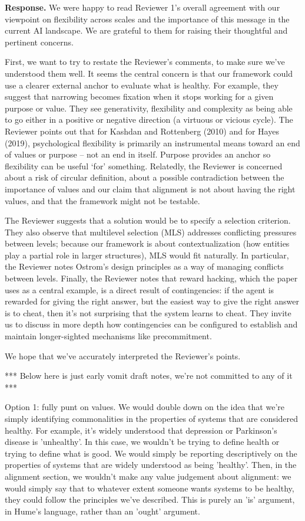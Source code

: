 \documentclass[fontsize=11.5pt]{scrartcl}
\newcounter{point}
\begin{document}
\noindent\textbf{Response.} We were happy to read Reviewer 1's overall agreement with our viewpoint on flexibility across scales and the importance of this message in the current AI landscape. We are grateful to them for raising their thoughtful and pertinent concerns.

First, we want to try to restate the Reviewer's comments, to make sure we've understood them well. It seems the central concern is that our framework could use a clearer external anchor to evaluate what is healthy. For example, they suggest that narrowing becomes fixation when it stops working for a given purpose or value. They see generativity, flexibility and complexity as being able to go either in a positive or negative direction (a virtuous or vicious cycle). The Reviewer points out that for Kashdan and Rottenberg (2010) and for Hayes (2019), psychological flexibility is primarily an instrumental means toward an end of values or purpose -- not an end in itself. Purpose provides an anchor so flexibility can be useful `for' something. Relatedly, the Reviewer is concerned about a risk of circular definition, about a possible contradiction between the importance of values and our claim that alignment is not about having the right values, and that the framework might not be testable. 

The Reviewer suggests that a solution would be to specify a selection criterion. They also observe that multilevel selection (MLS) addresses conflicting pressures between levels; because our framework is about contextualization (how entities play a partial role in larger structures), MLS would fit naturally. In particular, the Reviewer notes Ostrom's design principles as a way of managing conflicts between levels. Finally, the Reviewer notes that reward hacking, which the paper uses as a central example, is a direct result of contingencies: if the agent is rewarded for giving the right answer, but the easiest way to give the right answer is to cheat, then it's not surprising that the system learns to cheat. They invite us to discuss in more depth how contingencies can be configured to establish and maintain longer-sighted mechanisms like precommitment. 

We hope that we've accurately interpreted the Reviewer's points. 


*** Below here is just early vomit draft notes, we're not committed to any of it ***

Option 1: fully punt on values. We would double down on the idea that we're simply identifying commonalities in the properties of systems that are considered healthy. For example, it's widely understood that depression or Parkinson's disease is 'unhealthy'. In this case, we wouldn't be trying to define health or trying to define what is good. We would simply be reporting descriptively on the properties of systems that are widely understood as being 'healthy'. Then, in the alignment section, we wouldn't make any value judgement about alignment: we would simply say that to whatever extent someone wants systems to be healthy, they could follow the principles we've described. This is purely an 'is' argument, in Hume's language, rather than an 'ought' argument.
\end{document}
